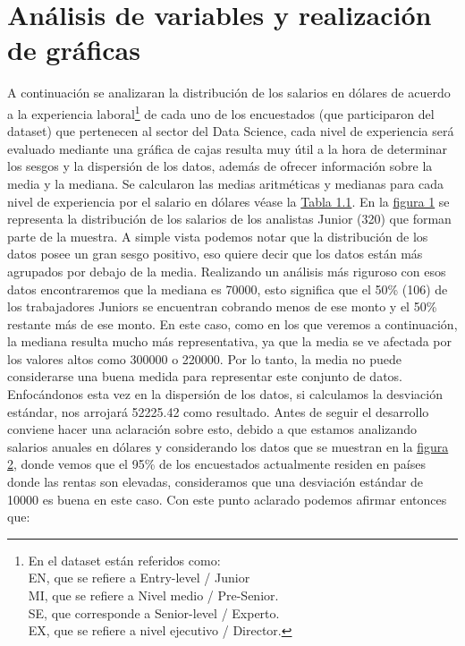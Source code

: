 \documentclass{article}
\begin{document}
	\section{Análisis de variables y realización de gráficas}
	A continuación se analizaran la distribución de los salarios en dólares de acuerdo a la experiencia laboral\footnote{En el dataset están referidos como:
		\\EN, que se refiere a Entry-level / Junior
		\\MI, que se refiere a Nivel medio / Pre-Senior.
		\\SE, que corresponde a Senior-level / Experto.
		\\EX, que se refiere a nivel ejecutivo / Director.} de cada uno de los encuestados (que participaron del dataset) que pertenecen al sector del Data Science, cada nivel de experiencia será evaluado mediante una gráfica de cajas resulta muy útil a la hora de determinar los sesgos y la dispersión de los datos, además de ofrecer información sobre la media y la mediana. Se calcularon las medias aritméticas y medianas para cada nivel de experiencia por el salario en dólares véase la \hyperref[tabla 1.1]{Tabla 1.1}.
	En la \hyperref[figura 1.1 diagrama]{figura 1} se representa la distribución de los salarios de los analistas Junior (320) que forman parte de la muestra. A simple vista podemos notar que la distribución de los datos posee un gran sesgo positivo, eso quiere decir que los datos están más agrupados por debajo de la media.
	Realizando un análisis más riguroso con esos datos encontraremos que la mediana es 70000, esto significa que el 50\% (106) de los trabajadores Juniors se encuentran cobrando menos de ese monto y el 50\% restante más de ese monto. En este caso, como en los que veremos a continuación, la mediana resulta mucho más representativa, ya que la media se ve afectada por los valores altos como 300000 o 220000. Por lo tanto, la media no puede considerarse una buena medida para representar este conjunto de datos.
	Enfocándonos esta vez en la dispersión de los datos, si calculamos la desviación estándar, nos arrojará 52225.42 como resultado. Antes de seguir el desarrollo conviene hacer una aclaración sobre esto, debido a que estamos analizando salarios anuales en dólares y considerando los datos que se muestran en la \hyperref[figura 2 torta]{figura 2}, donde vemos que el 95\% de los encuestados actualmente residen en países donde las rentas son elevadas, consideramos que una desviación estándar de 10000 es buena en este caso.
	Con este punto aclarado podemos afirmar entonces que: 
\end{document}
